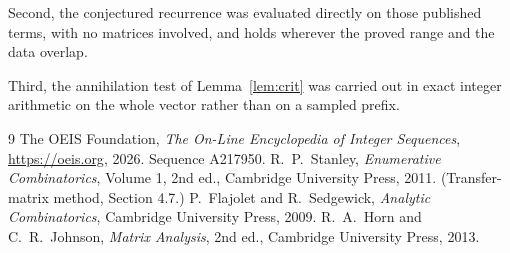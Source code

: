 \documentclass[11pt,a4paper]{article}
\theoremstyle{plain}
\theoremstyle{definition}
\begin{document}
Second, the conjectured recurrence was evaluated directly on those published terms, with no
matrices involved, and holds wherever the proved range and the data overlap.

Third, the annihilation test of Lemma~\ref{lem:crit} was carried out in exact integer
arithmetic on the whole vector rather than on a sampled prefix.

\begin{thebibliography}{9}
 The OEIS Foundation, \emph{The On-Line Encyclopedia of Integer
Sequences}, \url{https://oeis.org}, 2026. Sequence A217950.
 R.~P.~Stanley, \emph{Enumerative Combinatorics}, Volume 1, 2nd ed.,
Cambridge University Press, 2011. (Transfer-matrix method, Section 4.7.)
 P.~Flajolet and R.~Sedgewick, \emph{Analytic Combinatorics}, Cambridge
University Press, 2009.
 R.~A.~Horn and C.~R.~Johnson, \emph{Matrix Analysis}, 2nd ed., Cambridge
University Press, 2013.
\end{thebibliography}
\end{document}
